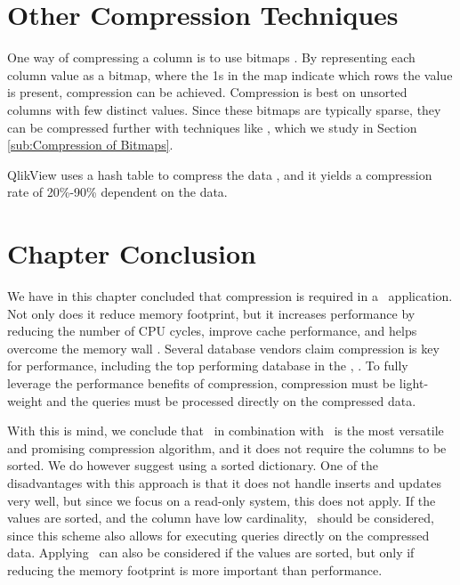 
\section{Other Compression Techniques}
\label{sec:Other Compression Techniques}
One way of compressing a column is to use bitmaps \cite{Stonebraker2005-qz} . By representing each column value as a bitmap, where the 1s in the map indicate which rows the value is present, compression can be achieved. Compression is best on unsorted columns with few distinct values. Since these bitmaps are typically sparse, they can be compressed further with techniques like \rle, which we study in Section \ref{sub:Compression of Bitmaps}.

QlikView uses a hash table to compress the data \cite{Qlik2014-vd}, and it yields a compression rate of 20\%-90\% dependent on the data.

\section{Chapter Conclusion}
\label{sec:Chapter Conclusion}
We have in this chapter concluded that compression is required in a \bd~application. Not only does it reduce memory footprint, but it increases performance by reducing the number of CPU cycles, improve cache performance, and helps overcome the memory wall . Several database vendors claim compression is key for performance, including the top performing database in the \tpch, \exasol. To fully leverage the performance benefits of compression, compression must be light-weight and the queries must be processed directly on the compressed data. 

With this is mind, we conclude that \de~in combination with \bp~is the most versatile and promising compression algorithm, and it does not require the columns to be sorted. We do however suggest using a sorted dictionary. One of the disadvantages with this approach is that it does not handle inserts and updates very well, but since we focus on a read-only system, this does not apply. If the values are sorted, and the column have low cardinality, \rle~should be considered, since this scheme also allows for executing queries directly on the compressed data. Applying \dele~can also be considered if the values are sorted, but only if reducing the memory footprint is more important than performance.



